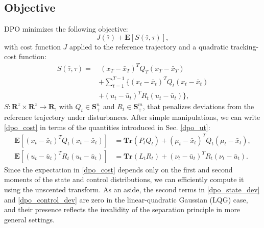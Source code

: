 \subsection{Objective}
DPO minimizes the following objective:
\begin{equation} \label{dpo_cost}
	J(\bar{\tau}) + \mathbf{E} [ S(\bar{\tau}, \tau) ] ,
\end{equation}
with cost function $J$ applied to the reference trajectory and a quadratic tracking-cost function:
\begin{equation}
	\begin{aligned}
		S(\bar{\tau},\tau) =&~(x_T - \bar{x}_T)^T Q_T (x_T - \bar{x}_T) \\ 
		& + \sum \limits_{t=1}^{T-1} \{(x_t - \bar{x}_t)^T Q_t (x_t - \bar{x}_t) \\
		& + (u_t - \bar{u}_t)^T R_t (u_t - \bar{u}_t)\},
		\label{dpo_sample_cost}
	\end{aligned}
\end{equation}
$S : \mathbf{R}^z \times \mathbf{R}^z \rightarrow \mathbf{R}$, with $Q_t \in \mathbf{S}_{+}^n$ and $R_t \in \mathbf{S}_{+}^m$, that penalizes deviations from the reference trajectory under disturbances. After  simple manipulations, we can write \eqref{dpo_cost} in terms of the quantities introduced in Sec. \ref{dpo_ut}:
\begin{align}
	\mathbf{E} [ (x_t - \bar{x}_t)^T Q_t (x_t - \bar{x}_t) ] &= \mathbf{Tr}(P_t Q_t) + (\mu_t - \bar{x}_t)^T Q_t (\mu_t - \bar{x}_t),
	\label{dpo_state_dev} \\
	\mathbf{E} [ (u_t - \bar{u}_t)^T R_t (u_t - \bar{u}_t) ] &= \mathbf{Tr}(L_t R_t) + (\nu_t - \bar{u}_t)^T R_t (\nu_t - \bar{u}_t).
	\label{dpo_control_dev}
\end{align}
Since the expectation in \eqref{dpo_cost} depends only on the first and second moments of the state and control distributions, we can efficiently compute it using the unscented transform. As an aside, the second terms in \eqref{dpo_state_dev} and \eqref{dpo_control_dev} are zero in the linear-quadratic Gaussian (LQG) case, and their presence reflects the invalidity of the separation principle in more general settings.

